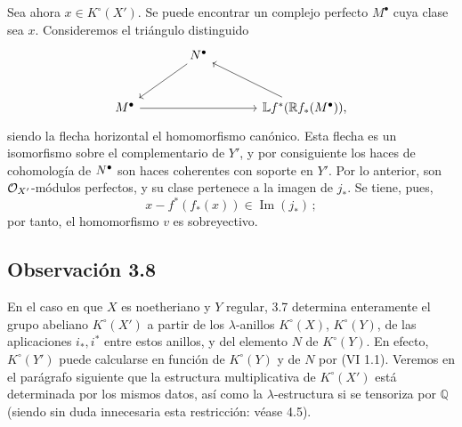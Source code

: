 Sea ahora \(x\in K^\circ(X')\). Se puede encontrar un complejo perfecto \(M^\bullet\) cuya clase sea \(x\). Consideremos el triángulo distinguido
\[
\begin{tikzcd}[column sep=large,row sep=large]
& N^\bullet \arrow[dl] &\\
M^\bullet \arrow[rr] && \mathbb Lf^*(\mathbb Rf_*(M^\bullet)) \arrow[ul] ,
\end{tikzcd}
\]
siendo la flecha horizontal el homomorfismo canónico. Esta flecha es un isomorfismo sobre el complementario de \(Y'\), y por consiguiente los haces de cohomología de \(\sisi{N'}{N^\bullet}\) son haces coherentes con soporte en \(Y'\). Por lo anterior, son \(\cO_{X'}\)-módulos perfectos, y su clase pertenece a la imagen de \(j_*\). Se tiene, pues,
\[
x-f^*(f_*(x))\in\operatorname{Im}(j_*)\,;
\]
por tanto, el homomorfismo \(v\) es sobreyectivo.



\providecommand{\Q}{\mathbb Q}
\providecommand{\bfP}{\mathbf P}
\providecommand{\gr}{\operatorname{gr}}
\providecommand{\Id}{\operatorname{Id}}
\providecommand{\Fil}{\operatorname{Fil}}
\providecommand{\Imf}{\operatorname{Im}}
\providecommand{\rank}{\operatorname{rank}}
\providecommand{\codim}{\operatorname{codim}}
\providecommand{\cJ}{\mathcal J}
\providecommand{\cI}{\mathcal I}
\providecommand{\cN}{\mathcal N}
\providecommand{\cE}{\mathcal E}
\providecommand{\cO}{\mathcal O}


\subsection*{Observación 3.8}

En el caso en que \(X\) es noetheriano y \(Y\) regular, 3.7 determina enteramente el grupo abeliano \(K^\circ(X')\) a partir de los \(\lambda\)-anillos \(K^\circ(X)\), \(K^\circ(Y)\), de las aplicaciones \(i_*,i^*\) entre estos anillos, y del elemento \(N\) de \(K^\circ(Y)\). En efecto, \(K^\circ(Y')\) puede calcularse en función de \(K^\circ(Y)\) y de \(N\) por (VI 1.1). Veremos en el parágrafo siguiente que la estructura multiplicativa de \(K^\circ(X')\) está determinada por los mismos datos, así como la \(\lambda\)-estructura si se tensoriza por \(\mathbb Q\) (siendo sin duda innecesaria esta restricción: véase 4.5).
